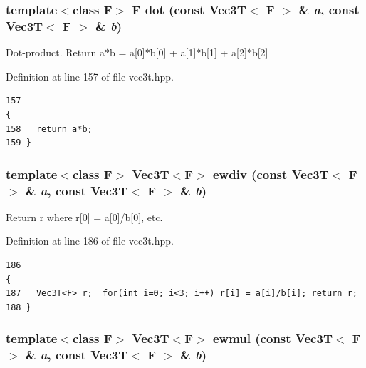 \subsubsection{\setlength{\rightskip}{0pt plus 5cm}template$<$class F$>$ F dot (const {\bf Vec3T}$<$ F $>$ \& {\em a}, const {\bf Vec3T}$<$ F $>$ \& {\em b})\hspace{0.3cm}{\tt  [inline]}}\label{vec3t_8hpp_e7cbe646ac75de564be89be6ede001e5_e7cbe646ac75de564be89be6ede001e5}


Dot-product. Return a$\ast$b = a[0]$\ast$b[0] + a[1]$\ast$b[1] + a[2]$\ast$b[2] 

Definition at line 157 of file vec3t.hpp.

\footnotesize\begin{verbatim}157                                                                              {
158   return a*b;
159 }
\end{verbatim}\normalsize 


\subsubsection{\setlength{\rightskip}{0pt plus 5cm}template$<$class F$>$ {\bf Vec3T}$<$F$>$ ewdiv (const {\bf Vec3T}$<$ F $>$ \& {\em a}, const {\bf Vec3T}$<$ F $>$ \& {\em b})\hspace{0.3cm}{\tt  [inline]}}\label{vec3t_8hpp_1f2e88b3ba21ad4c73ea002dbba3d3e4_1f2e88b3ba21ad4c73ea002dbba3d3e4}


Return r where r[0] = a[0]/b[0], etc. 

Definition at line 186 of file vec3t.hpp.

\footnotesize\begin{verbatim}186                                                                               { 
187   Vec3T<F> r;  for(int i=0; i<3; i++) r[i] = a[i]/b[i]; return r;
188 }
\end{verbatim}\normalsize 


\subsubsection{\setlength{\rightskip}{0pt plus 5cm}template$<$class F$>$ {\bf Vec3T}$<$F$>$ ewmul (const {\bf Vec3T}$<$ F $>$ \& {\em a}, const {\bf Vec3T}$<$ F $>$ \& {\em b})\hspace{0.3cm}{\tt  [inline]}}\label{vec3t_8hpp_b452e1e569dbb1dbf843a6be49300cd2_b452e1e569dbb1dbf843a6be49300cd2}


